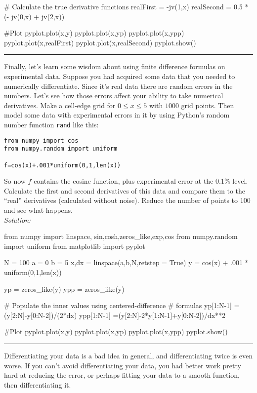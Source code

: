 \begin{enumerate}
\begin{codeexample}
\begin{VerbatimOut}{\listingFile}
# Calculate the true derivative functions
realFirst = -jv(1,x)
realSecond = 0.5 * (- jv(0,x) + jv(2,x))

#Plot
pyplot.plot(x,y)
pyplot.plot(x,yp)
pyplot.plot(x,ypp)
pyplot.plot(x,realFirst)
pyplot.plot(x,realSecond)
pyplot.show()
\end{VerbatimOut}
\end{codeexample}
\else
\noindent\rule{5 in}{0.01 in}
\fi



\prob \label{P:1.DerivExper} 

Finally, let's learn some wisdom about using finite difference
formulas on experimental data. Suppose you had acquired some data
that you needed to numerically differentiate. Since it's real data
there are random errors in the numbers.  Let's see how those errors
affect your ability to take numerical derivatives.
    Make a cell-edge grid for $0 \le x \le 5$ with $1000$ grid
    points. Then model some data with experimental errors in it
    by using Python's random number function {\tt rand} like
    this:
\begin{Verbatim}
from numpy import cos
from numpy.random import uniform

f=cos(x)+.001*uniform(0,1,len(x))
\end{Verbatim}
    So now $f$ contains the cosine function, plus experimental
    error at the 0.1\% level.  Calculate the first and second
    derivatives of this data and compare them to the ``real''
    derivatives (calculated without noise). Reduce the number of
    points to 100 and see what happens.\\
\ifsolutions
\textit{Solution:}\\
\begin{codeexample}
\begin{VerbatimOut}{\listingFile}
from numpy import linspace, sin,cosh,zeros_like,exp,cos
from numpy.random import uniform
from matplotlib import pyplot


N = 100
a = 0
b = 5
x,dx = linspace(a,b,N,retstep = True)
y = cos(x) + .001 * uniform(0,1,len(x))

yp = zeros_like(y)
ypp = zeros_like(y)

# Populate the inner values using centered-difference
# formulas
yp[1:N-1] =(y[2:N]-y[0:N-2])/(2*dx)
ypp[1:N-1] =(y[2:N]-2*y[1:N-1]+y[0:N-2])/dx**2



#Plot
pyplot.plot(x,y)
pyplot.plot(x,yp)
pyplot.plot(x,ypp)
pyplot.show()
\end{VerbatimOut}
\end{codeexample}
\else
\noindent\rule{5 in}{0.01 in}
\fi

Differentiating your data is a bad idea in general, and
differentiating twice is even worse.  If you can't avoid
differentiating your data, you had better work pretty hard at reducing
the error, or perhaps fitting your data to a smooth function, then
differentiating it.
\end{enumerate}
